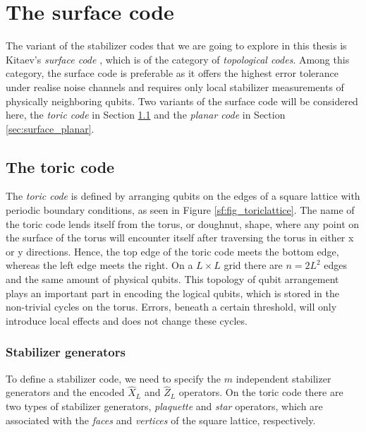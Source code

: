 
\chapter{The surface code}\label{ch:surfacecode}

The variant of the stabilizer codes that we are going to explore in this thesis is Kitaev's \emph{surface code} \cite{kitaev2003fault}, which is of the category of \emph{topological codes}. Among this category, the surface code is preferable as it offers the highest error tolerance under realise noise channels and requires only local stabilizer measurements of physically neighboring qubits. Two variants of the surface code will be considered here, the \emph{toric code} in Section \ref{sec:surface_toric} and the \emph{planar code} in Section \ref{sec:surface_planar}.


\section{The toric code}\label{sec:surface_toric}
The \emph{toric code} is defined by arranging qubits on the edges of a square lattice with periodic boundary conditions, as seen in Figure \ref{sf:fig_toriclattice}. The name of the toric code lends itself from the torus, or doughnut, shape, where any point on the surface of the torus will encounter itself after traversing the torus in either x or y directions. Hence, the top edge of the toric code meets the bottom edge, whereas the left edge meets the right. On a $L\times L$ grid there are $n = 2L^2$ edges and the same amount of physical qubits. This topology of qubit arrangement plays an important part in encoding the logical qubits, which is stored in the non-trivial cycles on the torus. Errors, beneath a certain threshold, will only introduce local effects and does not change these cycles.

\subsection{Stabilizer generators}

To define a stabilizer code, we need to specify the $m$ independent stabilizer generators and the encoded $\hat{X}_L$ and $\hat{Z}_L$ operators. On the toric code there are two types of stabilizer generators, \emph{plaquette} and \emph{star} operators, which are associated with the \emph{faces} and \emph{vertices} of the square lattice, respectively.


